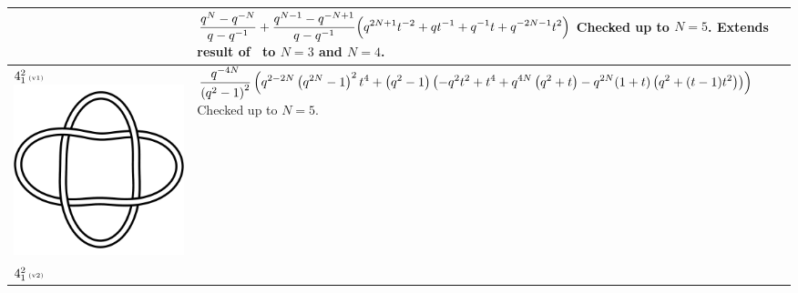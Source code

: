 \documentclass{compositio}
\theoremstyle{definition}
\numberwithin{equation}{section}
\begin{document}
{\begin{longtable}{p{}|p{}}
&
\newline 
$
\displaystyle{%
\frac{q^N-q^{-N}}{q-q^{-1}} + \frac{q^{N-1}-q^{-N+1}}{q-q^{-1}}  \Big( q^{2N+1} t^{-2} + q t^{-1} + q^{-1} t + q^{-2N-1} t^2 \Big)
}
$
\newline\newline\newline
Checked up to $N=5$. Extends result of~\cite{r0508510} to $N=3$ and $N=4$. 
\\
\hline
$4_{1}^2\,\text{{\tiny (v1)}}$ 
\includegraphics[scale=0.07,angle=0]{link4_1_2.pdf} 
& 
\newline
$
\displaystyle{%
\frac{q^{-4 N}}{\left(q^2 - 1\right)^2} \left(q^{2-2 N} \left(q^{2 N}-1\right)^2 t^4+\left(q^2 - 1\right) \left(-q^2 t^2+t^4+q^{4 N} \left(q^2+t\right)-q^{2 N} (1+t) \left(q^2+(t-1) t^2\right)\right)\right) 
}
$
\newline\newline\newline
Checked up to $N=5$.
\\
\hline
$4_{1}^2\,\text{{\tiny (v2)}}$ 

\end{longtable}}
\end{document}

